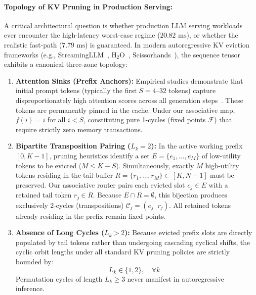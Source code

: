 \documentclass[journal,10pt,twocolumn]{article}
\begin{document}
\paragraph{Topology of KV Pruning in Production Serving:}
A critical architectural question is whether production LLM serving workloads ever encounter the high-latency worst-case regime ($20.82\text{ ms}$), or whether the realistic fast-path ($7.79\text{ ms}$) is guaranteed. In modern autoregressive KV eviction frameworks (e.g., StreamingLLM~\cite{xiao2023efficient}, $\text{H}_2\text{O}$~\cite{zhang2023h2o}, Scissorhands~\cite{liu2023scissorhands}), the sequence tensor exhibits a canonical three-zone topology:
\begin{enumerate}
    \item \textbf{Attention Sinks (Prefix Anchors):} Empirical studies demonstrate that initial prompt tokens (typically the first $S = 4\text{--}32$ tokens) capture disproportionately high attention scores across all generation steps~\cite{xiao2023efficient}. These tokens are permanently pinned in the cache. Under our associative map, $f(i) = i$ for all $i < S$, constituting pure 1-cycles (fixed points $\mathcal{F}$) that require strictly zero memory transactions.
    \item \textbf{Bipartite Transposition Pairing ($L_k = 2$):} In the active working prefix $[0, K-1]$, pruning heuristics identify a set $E = \{e_1, \dots, e_M\}$ of low-utility tokens to be evicted ($M \le K - S$). Simultaneously, exactly $M$ high-utility tokens residing in the tail buffer $R = \{r_1, \dots, r_M\} \subset [K, N-1]$ must be preserved. Our associative router pairs each evicted slot $e_j \in E$ with a retained tail token $r_j \in R$. Because $E \cap R = \emptyset$, this bijection produces exclusively 2-cycles (transpositions) $\mathcal{C}_j = (e_j \;\; r_j)$. All retained tokens already residing in the prefix remain fixed points.
    \item \textbf{Absence of Long Cycles ($L_k > 2$):} Because evicted prefix slots are directly populated by tail tokens rather than undergoing cascading cyclical shifts, the cyclic orbit lengths under all standard KV pruning policies are strictly bounded by:
    \begin{equation}
        L_k \in \{1, 2\}, \quad \forall k
    \end{equation}
    Permutation cycles of length $L_k \ge 3$ never manifest in autoregressive inference.
\end{enumerate}
\end{document}
